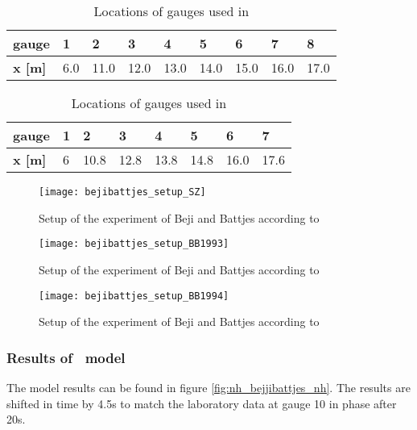\begin{table}[htbp]
\begin{tabular}{lllllllll}
\textbf{gauge} & 1 & 2 & 3 & 4 & 5 & 6 & 7 & 8 \\
\toprule
\textbf{x [m]} & 6.0 & 11.0 & 12.0 & 13.0 & 14.0 & 15.0 & 16.0 & 17.0 \\
\bottomrule
\end{tabular}
\caption{Locations of gauges used in \cite{BejiBattjes.1993}}
\label{tab:bejibattjes_gauges_BB1993}
\end{table}

\begin{table}[htbp]
\begin{tabular}{llllllll}
\textbf{gauge} & 1 & 2 & 3 & 4 & 5 & 6 & 7 \\
\toprule
\textbf{x [m]} & 6 & 10.8 & 12.8 & 13.8 & 14.8 & 16.0 & 17.6 \\
\bottomrule
\end{tabular}
\caption{Locations of gauges used in \cite{BejiBattjes.1994}}
\label{tab:bejibattjes_gauges_BB1994}
\end{table}

\begin{figure}[htbp]
\texttt{[image: bejibattjes\_setup\_SZ]}
\caption{Setup of the experiment of Beji and Battjes according to \cite{StellingZijlema.2003}}
\label{fig:bejibattjes_setup_SZ}
\end{figure}

\begin{figure}[htbp]
\texttt{[image: bejibattjes\_setup\_BB1993]}
\caption{Setup of the experiment of Beji and Battjes according to \cite{BejiBattjes.1993}}
\label{fig:bejibattjes_setup_BB1993}
\end{figure}

\begin{figure}[htbp]
\texttt{[image: bejibattjes\_setup\_BB1994]}
\caption{Setup of the experiment of Beji and Battjes according to \cite{BejiBattjes.1994}}
\label{fig:bejibattjes_setup_BB1994}
\end{figure}

\subsubsection{Results of \nh\ model}
The model results can be found in figure \eqref{fig:nh_bejjibattjes_nh}.
The results are shifted in time by 4.5s to match the laboratory data at gauge 10 in phase after 20s.

